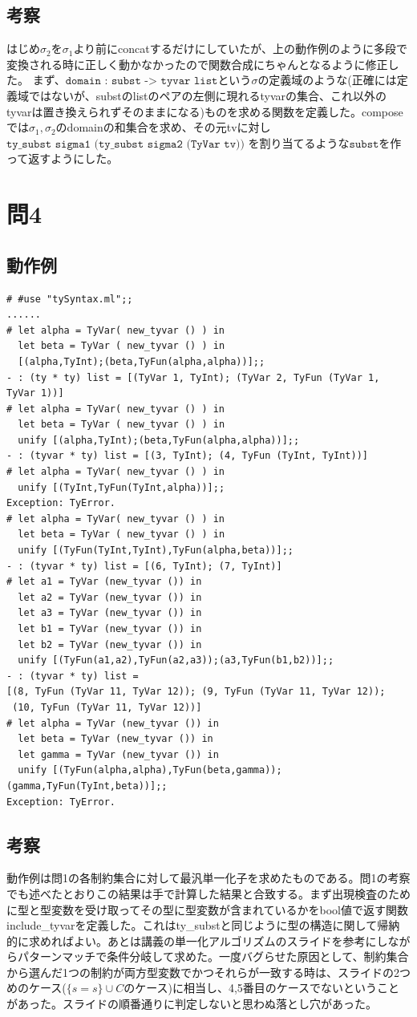 \documentclass[11pt,a4paper]{jsarticle}
\begin{document}
\subsection*{考察}
はじめ$\sigma_2$を$\sigma_1$より前にconcatするだけにしていたが、上の動作例のように多段で変換される時に正しく動かなかったので関数合成にちゃんとなるように修正した。
まず、$\texttt{domain : subst -> tyvar list}$という$\sigma$の定義域のような(正確には定義域ではないが、substのlistのペアの左側に現れるtyvarの集合、これ以外のtyvarは置き換えられずそのままになる)ものを求める関数を定義した。composeでは$\sigma_1,\sigma_2$のdomainの和集合を求め、その元tvに対し
$\texttt{ty\_subst sigma1 (ty\_subst sigma2 (TyVar tv))}$ を割り当てるような$\texttt{subst}$を作って返すようにした。
\section*{問4}
\subsection*{動作例}
\begin{lstlisting}[basicstyle=\ttfamily\footnotesize, frame=single]
# #use "tySyntax.ml";;
......
# let alpha = TyVar( new_tyvar () ) in 
  let beta = TyVar ( new_tyvar () ) in
  [(alpha,TyInt);(beta,TyFun(alpha,alpha))];;
- : (ty * ty) list = [(TyVar 1, TyInt); (TyVar 2, TyFun (TyVar 1, TyVar 1))]
# let alpha = TyVar( new_tyvar () ) in 
  let beta = TyVar ( new_tyvar () ) in
  unify [(alpha,TyInt);(beta,TyFun(alpha,alpha))];;
- : (tyvar * ty) list = [(3, TyInt); (4, TyFun (TyInt, TyInt))]
# let alpha = TyVar( new_tyvar () ) in 
  unify [(TyInt,TyFun(TyInt,alpha))];;
Exception: TyError.
# let alpha = TyVar( new_tyvar () ) in 
  let beta = TyVar ( new_tyvar () ) in
  unify [(TyFun(TyInt,TyInt),TyFun(alpha,beta))];;
- : (tyvar * ty) list = [(6, TyInt); (7, TyInt)]
# let a1 = TyVar (new_tyvar ()) in
  let a2 = TyVar (new_tyvar ()) in
  let a3 = TyVar (new_tyvar ()) in
  let b1 = TyVar (new_tyvar ()) in
  let b2 = TyVar (new_tyvar ()) in
  unify [(TyFun(a1,a2),TyFun(a2,a3));(a3,TyFun(b1,b2))];;
- : (tyvar * ty) list =
[(8, TyFun (TyVar 11, TyVar 12)); (9, TyFun (TyVar 11, TyVar 12));
 (10, TyFun (TyVar 11, TyVar 12))]
# let alpha = TyVar (new_tyvar ()) in
  let beta = TyVar (new_tyvar ()) in
  let gamma = TyVar (new_tyvar ()) in
  unify [(TyFun(alpha,alpha),TyFun(beta,gamma));(gamma,TyFun(TyInt,beta))];;
Exception: TyError.
\end{lstlisting}
\subsection*{考察}
動作例は問1の各制約集合に対して最汎単一化子を求めたものである。問1の考察でも述べたとおりこの結果は手で計算した結果と合致する。まず出現検査のために型と型変数を受け取ってその型に型変数が含まれているかをbool値で返す関数include\_tyvarを定義した。これはty\_substと同じように型の構造に関して帰納的に求めればよい。あとは講義の単一化アルゴリズムのスライドを参考にしながらパターンマッチで条件分岐して求めた。一度バグらせた原因として、制約集合から選んだ1つの制約が両方型変数でかつそれらが一致する時は、スライドの2つめのケース($\{s=s\}\cup C$のケース)に相当し、4,5番目のケースでないということがあった。スライドの順番通りに判定しないと思わぬ落とし穴があった。
\end{document}
